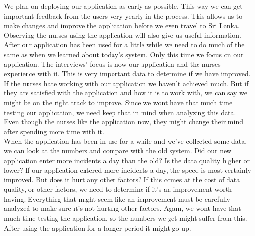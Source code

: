 \documentclass[UKenglish, 12pt]{article}
\begin{document}
We plan on deploying our application as early as possible. This way we can get
important feedback from the users very yearly in the process. This allows us to
make changes and improve the application before we even travel to Sri Lanka. 
Observing the nurses using the application will also give us useful information.\\

After our application has been used for a little while we need to do
much of the same as when we learned about today's system. Only this time we
focus on our application. The interviews' focus is now our application and the nurses
experience with it. This is very important data to determine if we have
improved. If the nurses hate working with our application we haven't achieved much.
But if they are satisfied with the application and how it is to work with, we can say
we might be on the right track to improve. Since we wont have that much time
testing our application, we need keep that in mind when analyzing this data.
Even though the nurses like the application now, they might change their mind after
spending more time with it.\\

When the application has been in use for a while and we've collected some data,
we can look at the numbers and compare with the old system. Did our new application
enter more incidents a day than the old? Is the data quality higher or lower?
If our application entered more incidents a day, the speed is most certainly
improved. But does it hurt any other factors? If this comes at the cost 
of data quality, or other factors, we need to determine if it's an improvement 
worth having. Everything that might seem like an improvement must be carefully
analyzed to make sure it's not hurting other factors. Again, we wont have that
much time testing the application, so the numbers we get might suffer from this.
After using the application for a longer period it might go up.

\newpage
\printbibliography
\end{document}
